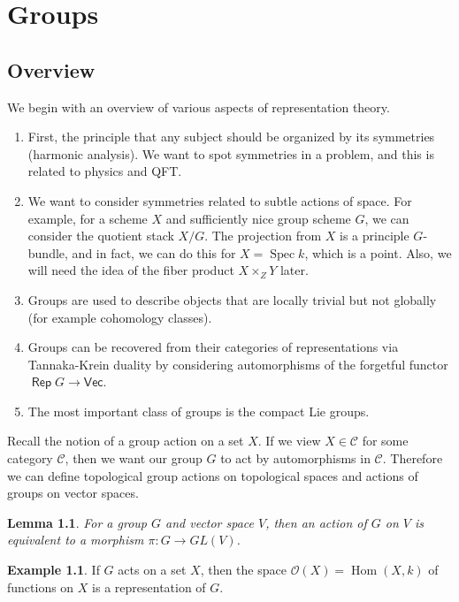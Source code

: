 \documentclass[leqno, openany]{memoir}
\newtheorem{lem}[thm]{Lemma}
\theoremstyle{definition}
\newtheorem{exm}[thm]{Example}
\theoremstyle{remark}
\theoremstyle{plain}
\theoremstyle{definition}
\theoremstyle{remark}
\newcommand{\mc}[1]{\mathcal{#1}}
\newcommand{\Vect}{\mathsf{Vec}}
\DeclareMathOperator{\Rep}{\mathsf{Rep}}
\DeclareMathOperator{\Hom}{Hom}
\begin{document}
\chapter{Groups}%

\section{Overview}%

We begin with an overview of various aspects of representation theory.
\begin{enumerate} \item First, the principle that any subject should be
    organized by its symmetries (harmonic analysis). We want to spot symmetries
    in a problem, and this is related to physics and QFT.  \item We want to
    consider symmetries related to subtle actions of space. For example, for a
    scheme $X$ and sufficiently nice group scheme $G$, we can consider the
    quotient stack $X / G$. The projection from $X$ is a principle $G$-bundle,
    and in fact, we can do this for $X = \operatorname{Spec} k$, which is a
    point. Also, we will need the idea of the fiber product $X \times_Z Y$
    later.  \item Groups are used to describe objects that are locally trivial
    but not globally (for example cohomology classes).  \item Groups can be
    recovered from their categories of representations via Tannaka-Krein
    duality by considering automorphisms of the forgetful functor $\Rep G \to
    \Vect$.  \item The most important class of groups is the compact Lie
    groups.  \end{enumerate}

Recall the notion of a group action on a set $X$. If we view $X \in \mc{C}$ for
some category $\mc{C}$, then we want our group $G$ to act by automorphisms in
$\mc{C}$. Therefore we can define topological group actions on topological
spaces and actions of groups on vector spaces.

\begin{lem} For a group $G$ and vector space $V$, then an action of $G$ on $V$
is equivalent to a morphism $\pi: G \to GL(V)$.  \end{lem}

\begin{exm} If $G$ acts on a set $X$, then the space $\mc{O}(X) = \Hom(X,k)$ of
functions on $X$ is a representation of $G$.  \end{exm}
\end{document}
